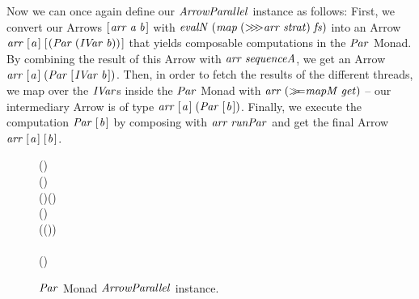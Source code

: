 \documentclass[paper=A4,twoside=true,openright,parskip=full,chapterprefix=true,headings=normal,bibliography=totoc,listof=totoc,titlepage=on,captions=tableabove,draft=false,british]{scrreprt}%
\begin{document}
Now we can once again define our \ensuremath{\Conid{ArrowParallel}} instance as follows:
First, we convert our Arrows \ensuremath{[\mskip1.5mu \Varid{arr}\;\Varid{a}\;\Varid{b}\mskip1.5mu]} with
\ensuremath{\Varid{evalN}\;(\Varid{map}\;(\mathbin{>\!\!>\!\!>}\Varid{arr}\;\Varid{strat})\;\Varid{fs})} into an Arrow
\ensuremath{\Varid{arr}\;[\mskip1.5mu \Varid{a}\mskip1.5mu]\;[\mskip1.5mu (\Conid{Par}\;(\Conid{IVar}\;\Varid{b}))\mskip1.5mu]} that yields composable computations in the
\ensuremath{\Conid{Par}} Monad. By combining the result of this Arrow with \ensuremath{\Varid{arr}\;\Varid{sequenceA}},
we get an Arrow \ensuremath{\Varid{arr}\;[\mskip1.5mu \Varid{a}\mskip1.5mu]\;(\Conid{Par}\;[\mskip1.5mu \Conid{IVar}\;\Varid{b}\mskip1.5mu])}. Then, in order to fetch the
results of the different threads, we map over the \ensuremath{\Conid{IVar}}s inside the
\ensuremath{\Conid{Par}} Monad with \ensuremath{\Varid{arr}\;(\bind \Varid{mapM}\;\Varid{get})} -- our intermediary Arrow is of
type \ensuremath{\Varid{arr}\;[\mskip1.5mu \Varid{a}\mskip1.5mu]\;(\Conid{Par}\;[\mskip1.5mu \Varid{b}\mskip1.5mu])}. Finally, we execute the computation \ensuremath{\Conid{Par}\;[\mskip1.5mu \Varid{b}\mskip1.5mu]}
by composing with \ensuremath{\Varid{arr}\;\Varid{runPar}} and get the final Arrow \ensuremath{\Varid{arr}\;[\mskip1.5mu \Varid{a}\mskip1.5mu]\;[\mskip1.5mu \Varid{b}\mskip1.5mu]}.

\begin{figure}[h]
\centering
\begin{hscode}\SaveRestoreHook
{}%
%
%
%
\>[B]{}\;\;\mathrel{=}\to {}\;(\;){}\<[E]%
\\
\>[B]{}\;\;\mathrel{=}\;(\;){}\<[E]%
\\[\blanklineskip]%
\>[B]{}\;(\;)\Rightarrow {}\;\;\;\;(\;)\;\<[E]%
\\
\>[B]{}\<[5]%
\>[5]{}\;(\;)\;\mathrel{=}{}\<[E]%
\\
\>[5]{}\<[9]%
\>[9]{}\;(\;(\mathbin{>\!\!>\!\!>}\;)\;)\mathbin{>\!\!>\!\!>}{}\<[E]%
\\
\>[5]{}\<[9]%
\>[9]{}\;\mathbin{>\!\!>\!\!>}{}\<[E]%
\\
\>[5]{}\<[9]%
\>[9]{}\;(\bind {}\;)\mathbin{>\!\!>\!\!>}{}\<[E]%
\\
\>[5]{}\<[9]%
\>[9]{}\;\<[E]%
\ColumnHook
\end{hscode}\resethooks
\caption{\ensuremath{\Conid{Par}} Monad \ensuremath{\Conid{ArrowParallel}} instance.}\label{fig:ArrowParallelParMonad}\end{figure}
\end{document}
